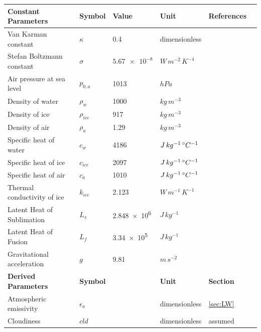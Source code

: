 \documentclass[utf8]{frontiersSCNS}
\begin{document}
\begin{table}[h!]
	\label{tab:parameters}
	\begin{tabular}{@{}llllll@{}}
		\toprule
		\textbf{Constant Parameters}                       & \textbf{Symbol} & \textbf{Value} &
    \textbf{Unit} & \textbf{References} \\\midrule
    Van Karman constant & $\kappa$      & 0.4        &dimensionless & \citeauthor{CuffeyPaterson_2010}              \\
    Stefan Boltzmann constant & $\sigma$ & $\num{5.67 e-8} $& $W\, m^{-2}\, K^{-4}$ & \citeauthor{CuffeyPaterson_2010}\\
    Air pressure at sea level & $p_{0,a}$ & 1013 & $hPa$  & \citeauthor{MolgHardy_2004}\\
    Density of water & $\rho_{w}$ & 1000 & $kg\, m^{-3}$    & \citeauthor{CuffeyPaterson_2010}\\
    Density of ice & $\rho_{ice}$ & 917 & $kg\, m^{-3}$ & \citeauthor{CuffeyPaterson_2010}\\
    Density of air & $\rho_{a}$ &  1.29 & $kg\, m^{-3}$   & \citeauthor{MolgHardy_2004}\\
    Specific heat of water & $c_{w}$ & 4186 & $J\, kg^{-1}\,\degree C^{-1}$  & \citeauthor{CuffeyPaterson_2010}\\
    Specific heat of ice & $c_{ice}$ & 2097 & $J\, kg^{-1}\,\degree C^{-1}$ & \citeauthor{CuffeyPaterson_2010}\\
    Specific heat of air & $c_{a}$ & 1010 & $J\, kg^{-1}\,\degree C^{-1}$ & \citeauthor{MolgHardy_2004}\\
    Thermal conductivity of ice & $k_{ice}$ & 2.123  & $W\, m^{-1}\, K^{-1}$ & \citeauthor{Bonales_2017} \\
    Latent Heat of Sublimation & $L_{s}$ & \num{2.848e6}  & $J\, kg^{-1}$ &   \citeauthor{CuffeyPaterson_2010}\\
    Latent Heat of Fusion & $L_{f}$ & \num{3.34e5} & $J\, kg^{-1}$ & \citeauthor{CuffeyPaterson_2010}\\
    Gravitational acceleration & $g$ & 9.81 & $m\, s^{-2}$ &\citeauthor{CuffeyPaterson_2010}\\\midrule
		\textbf{Derived Parameters} & \textbf{Symbol} & \textbf{} & \textbf{Unit} & \textbf{Section} \\\midrule
    Atmospheric emissivity & $\epsilon_{a}$ & & dimensionless    & \ref{sec:LW}\\
    Cloudiness & $cld$ &  & dimensionless  & assumed\\

\end{tabular}
\end{table}
\end{document}
